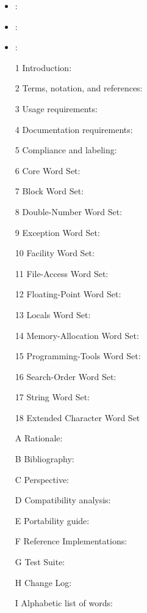  
	\begin{itemize}
	\item {}:							%
	\item {}:							%
	\item {}:							%
	\item[1] Introduction:							%
	\item[2] Terms, notation, and references:	%
	\item[3] Usage requirements:					%
	\item[4] Documentation requirements:		%
	\item[5] Compliance and labeling:			%
	\item[6] Core Word Set:							%
	\item[7] Block Word Set:						%
	\item[8] Double-Number Word Set:				%
	\item[9] Exception Word Set:					%
	\item[10] Facility Word Set:					%
	\item[11] File-Access Word Set:				%
	\item[12] Floating-Point Word Set:			%
	\item[13] Locals Word Set:						%
	\item[14] Memory-Allocation Word Set:		%
	\item[15] Programming-Tools Word Set:		%
	\item[16] Search-Order Word Set:				%
	\item[17] String Word Set:						%
	\item[18] Extended Character Word Set		%
	\item[A] Rationale:								%
	\item[B] Bibliography:							%
	\item[C] Perspective:							%
	\item[D] Compatibility analysis:				%
	\item[E] Portability guide:					%
	\item[F] Reference Implementations:			%
	\item[G] Test Suite:								%
	\item[H] Change Log:								%
	\item[I] Alphabetic list of words:			%
	\end{itemize}

\endinput

\version{ToDo}{}{\empty}
	\begin{itemize}
	\item Develop new Globalisation word set
	\item Develop extended Memory Access word set
	\end{itemize}
